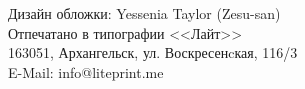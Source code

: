 \begin{titlingpage}
\begin{flushleft}
\begin{minipage}{0.85\textwidth}
\begin{flushleft}
\medskip

Дизайн обложки: Yessenia Taylor (Zesu-san)\\

\medskip
\makeatletter
Отпечатано в типографии <<Лайт>>\\
163051, Архангельск, ул. Воскресенcкая, 116/3\\
E-Mail: info@liteprint.me\\
\makeatother
\normalsize

\end{flushleft}
\end{minipage}
\end{flushleft}

\end{titlingpage}

